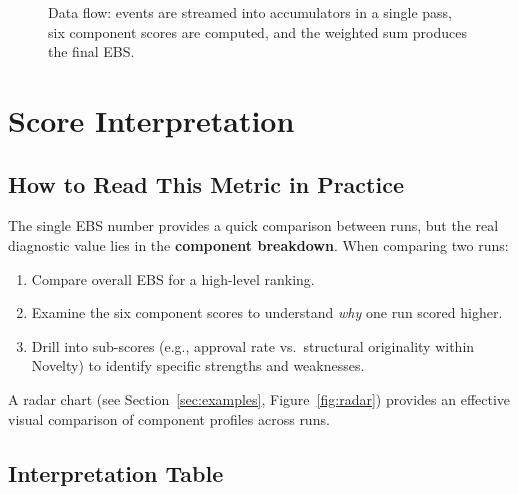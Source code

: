 \documentclass[a4paper, 11pt]{article}
\begin{document}
\begin{figure}
\caption{Data flow: events are streamed into accumulators in a single pass, six component scores are computed, and the weighted sum produces the final EBS.}
\label{fig:dataflow}
\end{figure}

\section{Score Interpretation}
\label{sec:interpretation}

\subsection{How to Read This Metric in Practice}

The single EBS number provides a quick comparison between runs, but the real diagnostic value lies in the \textbf{component breakdown}. When comparing two runs:

\begin{enumerate}[nosep]
    \item Compare overall EBS for a high-level ranking.
    \item Examine the six component scores to understand \emph{why} one run scored higher.
    \item Drill into sub-scores (e.g., approval rate vs.\ structural originality within Novelty) to identify specific strengths and weaknesses.
\end{enumerate}

A radar chart (see Section~\ref{sec:examples}, Figure~\ref{fig:radar}) provides an effective visual comparison of component profiles across runs.

\subsection{Interpretation Table}
\end{document}
